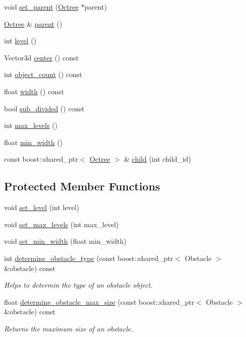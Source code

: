 \begin{CompactItemize}
\item 
void \hyperlink{class_octree_9b884a39d8adf578ced6df783d477c4c}{set\_\-parent} (\hyperlink{class_octree}{Octree} $\ast$parent)
\item 
\hyperlink{class_octree}{Octree} \& \hyperlink{class_octree_1aa93bae9b39e49b97f587357747cd17}{parent} ()
\item 
int \hyperlink{class_octree_e6729a08500e8937d91d809db870777c}{level} ()
\item 
Vector3d \hyperlink{class_octree_8a7a88c27aa9a48f6fbdfd6db5faa455}{center} () const 
\item 
int \hyperlink{class_octree_88cb79978d550bdd2699c15fe9879fc4}{object\_\-count} () const 
\item 
float \hyperlink{class_octree_174fc16c8dda632cf8c0ba7bfc9db4b0}{width} () const 
\item 
bool \hyperlink{class_octree_c05628e77200a5243dd1b0d84332ef39}{sub\_\-divided} () const 
\item 
int \hyperlink{class_octree_f514ecc29e3882b0c2e46ccb5ba4fcd9}{max\_\-levels} ()
\item 
float \hyperlink{class_octree_9c9093d2ed7caa8ac16a1f230a66428f}{min\_\-width} ()
\item 
const boost::shared\_\-ptr$<$ \hyperlink{class_octree}{Octree} $>$ \& \hyperlink{class_octree_211c7b90c150193b6124c05229eb2abb}{child} (int child\_\-id)
\end{CompactItemize}
\subsection*{Protected Member Functions}
\begin{CompactItemize}
\item 
void \hyperlink{class_octree_3456b71a9ff5067eed4317fe10947fcf}{set\_\-level} (int level)
\item 
void \hyperlink{class_octree_eb0215c31bf2b52267e0252940812680}{set\_\-max\_\-levels} (int max\_\-level)
\item 
void \hyperlink{class_octree_046a7db4d122f2b8ef6a5188ef78ffda}{set\_\-min\_\-width} (float min\_\-width)
\item 
int \hyperlink{class_octree_a721cdd20e21a952ea04721ae756d091}{determine\_\-obstacle\_\-type} (const boost::shared\_\-ptr$<$ Obstacle $>$ \&obstacle) const 
\begin{CompactList}\small\item\em Helps to determin the type of an obstacle object. \item\end{CompactList}\item 
float \hyperlink{class_octree_295852d7bca479a4abf01c579d2e93ae}{determine\_\-obstacle\_\-max\_\-size} (const boost::shared\_\-ptr$<$ Obstacle $>$ \&obstacle) const 
\begin{CompactList}\small\item\em Returns the maximum size of an obstacle. \item\end{CompactList}\end{CompactItemize}
